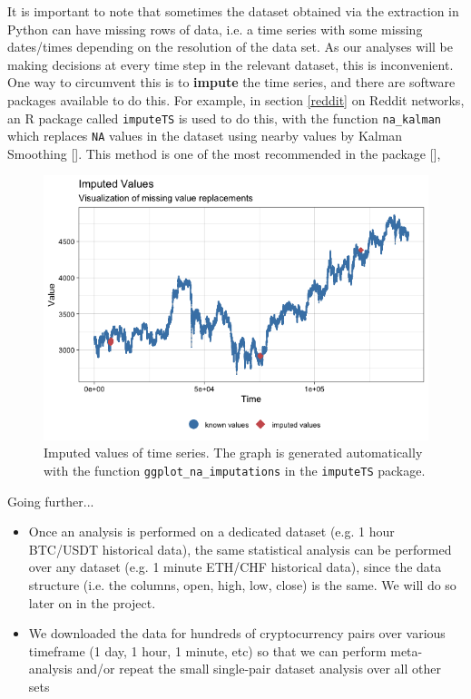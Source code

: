 \documentclass[twoside]{report}
\newcommand{\code}{\texttt}
\begin{document}
\begin{spacing}{1}
\begin{itemize}
\end{itemize}

It is important to note that sometimes the dataset obtained via the extraction in Python can have missing rows of data, i.e. a time series with some missing dates/times depending on the resolution of the data set. As our analyses will be making decisions at every time step in the relevant dataset, this is inconvenient. One way to circumvent this is to \textbf{impute} the time series, and there are software packages available to do this. For example, in section \ref{reddit} on Reddit networks, an R package called \code{imputeTS} is used to do this, with the function \code{na\_kalman} which replaces \code{NA} values in the dataset using nearby values by Kalman Smoothing []. This method is one of the most recommended in the package [],

\begin{figure}[H]
    \centering
    \includegraphics[width=\linewidth]{Reddit_Analysis/Price_Data_Extraction/Data/Binance_OHLC/imputed_gg_1m.png}
    \caption{Imputed values of time series. The graph is generated automatically with the function \code{ggplot\_na\_imputations} in the \code{imputeTS} package.}
    \label{fig:imputations}
\end{figure}


Going further...

\begin{itemize}
    \item 
Once an analysis is performed on a dedicated dataset (e.g. 1 hour BTC/USDT historical data), the same statistical analysis can be performed over any dataset (e.g. 1 minute ETH/CHF historical data), since the data structure (i.e. the columns, open, high, low, close) is the same. We will do so later on in the project.
    \item
We downloaded the data for hundreds of cryptocurrency pairs over various timeframe (1 day, 1 hour, 1 minute, etc) so that we can perform meta-analysis and/or repeat the small single-pair dataset analysis over all other sets


\end{itemize}
\end{spacing}
\end{document}
